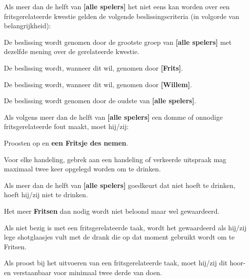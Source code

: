 \vervolgLijst{}
    \item \label{item:beslissingCriteria} Als meer dan de helft van \textbf{[alle spelers]} het niet eens kan worden over een fritsgerelateerde kwestie gelden de volgende beslissingscriteria (in volgorde van belangrijkheid):
    \numeriekeLijst{}
        \item De beslissing wordt genomen door de grootste groep van \textbf{[alle spelers]} met dezelfde mening over de gerelateerde kwestie. 
        \item De beslissing wordt, wanneer \Frits dit wil, genomen door \textbf{[Frits]}.
        \item De beslissing wordt, wanneer \Willem dit wil, genomen door \textbf{[Willem]}.
        \item De beslissing wordt genomen door de oudste van \textbf{[alle spelers]}.
    \eindNumeriekeLijst{}
\eindLijst{}

\vervolgLijst{}
    \item Als \eenSpeler volgens meer dan de helft van \textbf{[alle spelers]} een domme of onnodige fritsgerelateerde fout maakt, moet hij/zij:
    \puntLijst{}
        \item Proosten op  en \textbf{een Fritsje des nemen}\footnotemark[1].
    \eindPuntLijst{}
\eindLijst{}  

\vervolgLijst{}
    \item Voor elke handeling, gebrek aan een handeling of verkeerde uitspraak mag \eenSpeler maximaal twee keer opgelegd worden om te drinken.
\eindLijst{}   

\vervolgLijst{}
    \item Als meer dan de helft van \textbf{[alle spelers]} goedkeurt dat \eenSpeler niet hoeft te drinken, hoeft hij/zij niet te drinken.
\eindLijst{}   

\vervolgLijst{}
    \item Het meer \textbf{Fritsen} dan nodig wordt niet beloond maar wel gewaardeerd.
\eindLijst{}   

\vervolgLijst{}
    \item Als \eenSpeler niet bezig is met een fritsgerelateerde taak, wordt het gewaardeerd als hij/zij lege shotglaasjes vult met de drank die op dat moment gebruikt wordt om te Fritsen.
\eindLijst{}   

\vervolgLijst{}
    \item Als \eenSpeler proost bij het uitvoeren van een fritsgerelateerde taak, moet hij/zij dit hoor- en verstaanbaar voor minimaal twee derde van \alleSpelers doen.
\eindLijst{} 

